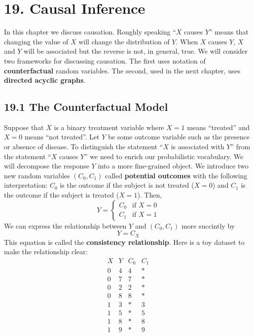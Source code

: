 \section*{19. Causal Inference}\label{causal-inference}
In this chapter we discuss causation. Roughly speaking ``\(X\) causes
\(Y\)'' means that changing the value of \(X\) will change the
distribution of \(Y\). When \(X\) causes \(Y\), \(X\) and \(Y\) will be
associated but the reverse is not, in general, true.
We will consider two frameworks for discussing causation. The first uses
notation of \textbf{counterfactual} random variables. The second, used
in the next chapter, uses \textbf{directed acyclic graphs}.

\subsection*{19.1 The Counterfactual Model}\label{the-counterfactual-model}
Suppose that \(X\) is a binary treatment variable where \(X = 1\) means
``treated'' and \(X = 0\) means ``not treated''.
Let \(Y\) be some outcome variable such as the presence or absence of
disease. To distinguish the statement ``\(X\) is associated with \(Y\)''
from the statement ``\(X\) causes \(Y\)'' we need to enrich our
probabilistic vocabulary. We will decompose the response \(Y\) into a
more fine-grained object.
We introduce two new random variables \((C_{0}, C_{1})\) called
\textbf{potential outcomes} with the following interpretation: \(C_{0}\)
is the outcome if the subject is not treated (\(X = 0\)) and \(C_{1}\) is
the outcome if the subject is treated (\(X = 1\)). Then,
\[
Y = \begin{cases}
C_{0} & \text{if } X = 0 \\
C_{1} & \text{if } X = 1
\end{cases}
\]
We can express the relationship between \(Y\) and \((C_{0}, C_{1})\) more
succintly by
\[
Y = C_X
\]
This equation is called the \textbf{consistency relationship}.
Here is a toy dataset to make the relationship clear:
\[
\begin{array}{cccc}
X & Y & C_{0} & C_{1} \\
\hline
0 & 4 & 4 & * \\
0 & 7 & 7 & * \\
0 & 2 & 2 & * \\
0 & 8 & 8 & * \\
\hline
1 & 3 & * & 3 \\
1 & 5 & * & 5 \\
1 & 8 & * & 8 \\
1 & 9 & * & 9
\end{array}
\]
